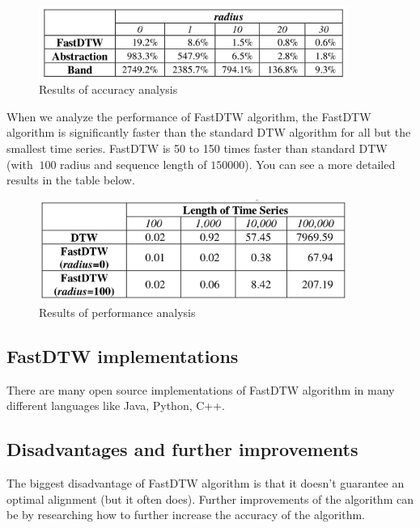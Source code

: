 \begin{figure}[H]
  \centerline{\includegraphics[width=0.9\textwidth]{images/fast_dtw_analysis.png}}
  \caption[Results of accuracy analysis]{Results of accuracy analysis}
  \label{obr:fast_dtw_analysis}
\end{figure}

When we analyze the performance of FastDTW algorithm, the FastDTW algorithm is significantly faster
than the standard DTW algorithm for all but the smallest time series. FastDTW is 50 to 150 times
faster than standard DTW (with $~100$ radius and sequence length of $150000$). You can see a more
detailed results in the table below.

\begin{figure}[H]
  \centerline{\includegraphics[width=0.9\textwidth]{images/dtw_performance.png}}
  \caption[Results of performance analysis]{Results of performance analysis}
  \label{obr:dtw_performance.png}
\end{figure}

\subsection{FastDTW implementations}

There are many open source implementations of FastDTW algorithm in many different languages like
Java, Python, C++.

\subsection{Disadvantages and further improvements}

The biggest disadvantage of FastDTW algorithm is that it doesn't guarantee an optimal alignment (but
it often does). Further improvements of the algorithm can be by researching how to further increase
the accuracy of the algorithm.
